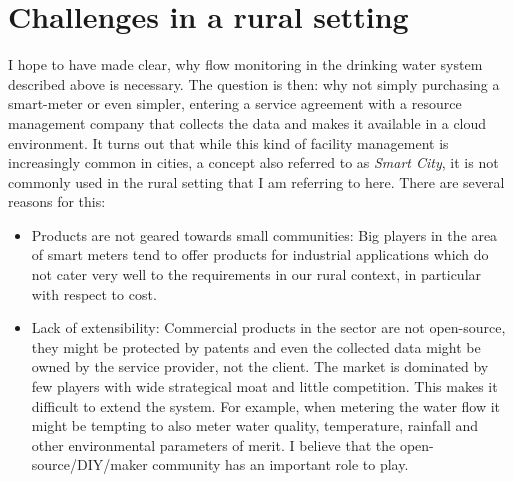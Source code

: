 \section{Challenges in a rural setting}

I hope to have made clear, why flow monitoring in the drinking water system described above is necessary.
The question is then: why not simply purchasing a smart-meter or even simpler, entering a service
agreement with a resource management company that collects the data and makes it available in a cloud
environment.
It turns out that while this kind of facility management is increasingly common in cities,
a concept also referred
to as \textit{Smart City}, it is not commonly used in the rural setting that I am referring to here.
There are several reasons for this:

\begin{itemize}
      \item Products are not geared towards small communities: Big players in the area of smart meters tend to offer products for
            industrial applications which do not cater very well to the requirements in our rural context, in particular with respect to cost.
      \item Lack of extensibility: Commercial products in the sector are not open-source, they
            might be protected by patents and even the collected data might be owned by the service provider, not the
            client. The market is dominated by few players with wide strategical moat and little competition.
            This makes it difficult to extend the system. For example, when metering the water flow it might be tempting to also meter
            water quality, temperature, rainfall and other environmental parameters of merit. I believe
            that the open-source/DIY/maker community has an important role to play.
\end{itemize}


